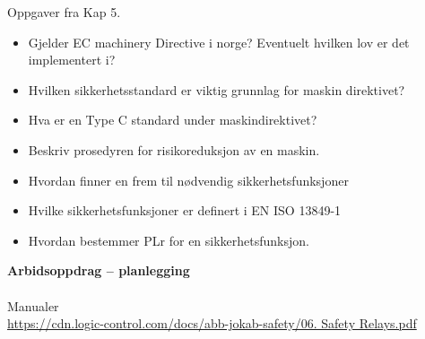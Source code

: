 \vskip 10pt 
Oppgaver fra Kap 5. 
\begin{itemize}[noitemsep]



	\item Gjelder EC machinery Directive i norge? Eventuelt hvilken lov er det implementert i?


	\item Hvilken sikkerhetsstandard er viktig grunnlag for maskin direktivet?

	\item Hva er en Type C standard under maskindirektivet?

	\item Beskriv prosedyren for risikoreduksjon av en maskin. 
%		
		

	\item Hvordan finner en frem til nødvendig sikkerhetsfunksjoner

	\item Hvilke sikkerhetsfunksjoner er definert i EN ISO 13849-1

	\item Hvordan bestemmer PLr for en sikkerhetsfunksjon. 

\end{itemize}
\vskip 10pt 
\textbf{Arbidsoppdrag -- planlegging}\\
\\
Manualer 
\\
\url {https://cdn.logic-control.com/docs/abb-jokab-safety/06. Safety Relays.pdf}
\\

